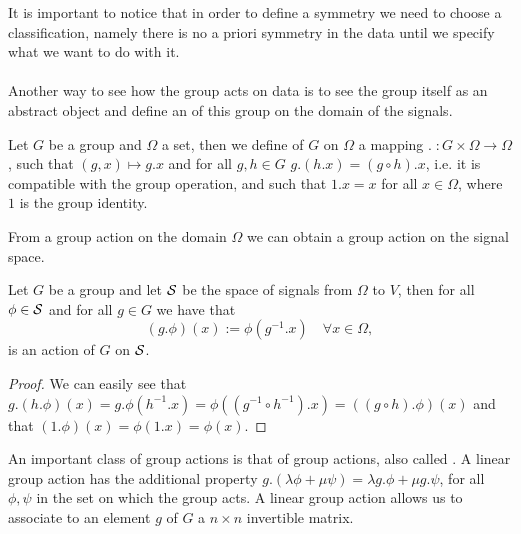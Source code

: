 \documentclass[../3.tex]{subfiles}
\begin{document}
    It is important to notice that in order to define a symmetry we need to choose a classification, namely there is no a priori symmetry in the data until
    we specify what we want to do with it.\\


    \hfill \\
    Another way to see how the group acts on data is to see the group itself as an abstract object and define an  of this group on the domain
    of the signals.

    \begin{defn}
        Let $G$ be a group and $\Omega$ a set, then we define  of $G$ on $\Omega$ a mapping $. \; : G \times \Omega \to \Omega$, such that
        $(g,x) \mapsto g.x$ and for all $g,h \in G$ $g.(h.x) = (g \circ h).x$, i.e. it is compatible with the group operation, and such that
        $1.x = x$ for all $x \in \Omega$, where $1$ is the group identity.
    \end{defn}

    From a group action on the domain $\Omega$ we can obtain a group action on the signal space.

    \begin{prop}
        Let $G$ be a group and let $\mathcal{S}$ be the space of signals from $\Omega$ to $V$, then for all $\phi \in \mathcal{S}$ and for all $g \in G$ we have that
        \[ (g.\phi)(x) := \phi(g^{-1}.x) \quad \forall x \in \Omega, \]
        is an action of $G$ on $\mathcal{S}$.
    \end{prop}
    \begin{proof}
        We can easily see that $g.(h.\phi)(x) = g.\phi(h^{-1}.x) = \phi((g^{-1} \circ h^{-1}).x) = ((g \circ h).\phi)(x)$ and that 
        $(1.\phi)(x) = \phi(1.x) = \phi(x)$. \qedhere
    \end{proof}

    An important class of group actions is that of  group actions, also called .
    A linear group action has the additional property $g.(\lambda \phi + \mu \psi) = \lambda g.\phi + \mu g.\psi$, for all $\phi,\psi$ in the set
    on which the group acts. A linear group action allows us to associate to an element $g$ of $G$ a $n \times n$ invertible matrix.
\end{document}
